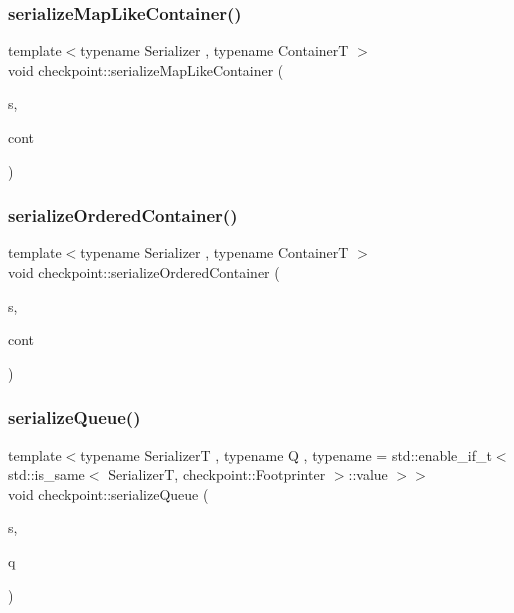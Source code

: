 \subsubsection{\texorpdfstring{serialize\+Map\+Like\+Container()}{serializeMapLikeContainer()}}
{\footnotesize\ttfamily template$<$typename Serializer , typename ContainerT $>$ \\
void checkpoint\+::serialize\+Map\+Like\+Container (\begin{DoxyParamCaption}\item[{\hyperlink{structcheckpoint_1_1_serializer}{Serializer} \&}]{s,  }\item[{ContainerT \&}]{cont }\end{DoxyParamCaption})\hspace{0.3cm}{\ttfamily [inline]}}

\mbox{\label{namespacecheckpoint_a0b15edc50a881e06260e7112b2c60742}} 
\subsubsection{\texorpdfstring{serialize\+Ordered\+Container()}{serializeOrderedContainer()}}
{\footnotesize\ttfamily template$<$typename Serializer , typename ContainerT $>$ \\
void checkpoint\+::serialize\+Ordered\+Container (\begin{DoxyParamCaption}\item[{\hyperlink{structcheckpoint_1_1_serializer}{Serializer} \&}]{s,  }\item[{ContainerT \&}]{cont }\end{DoxyParamCaption})\hspace{0.3cm}{\ttfamily [inline]}}

\mbox{\label{namespacecheckpoint_a2d9ca0472b4055b11e967503e9b37394}} 
\subsubsection{\texorpdfstring{serialize\+Queue()}{serializeQueue()}}
{\footnotesize\ttfamily template$<$typename SerializerT , typename Q , typename  = std\+::enable\+\_\+if\+\_\+t$<$    std\+::is\+\_\+same$<$      Serializer\+T,      checkpoint\+::\+Footprinter    $>$\+::value  $>$$>$ \\
void checkpoint\+::serialize\+Queue (\begin{DoxyParamCaption}\item[{SerializerT \&}]{s,  }\item[{const Q \&}]{q }\end{DoxyParamCaption})}

